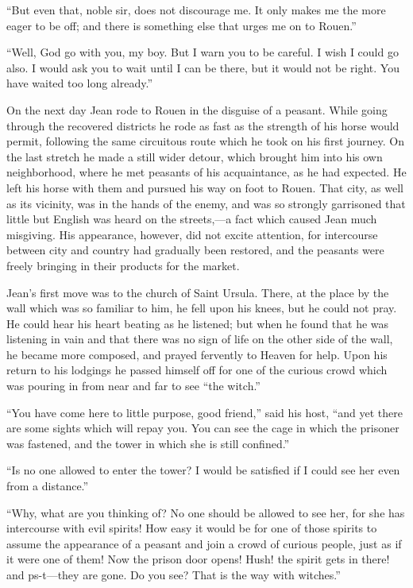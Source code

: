 ``But even that, noble sir, does not discourage me. It only makes me the
more eager to be off; and there is something else that urges me on to
Rouen.''

``Well, God go with you, my boy. But I warn you to be careful. I wish I
could go also. I would ask you to wait until I can be there, but it
would not be right. You have waited too long already.''

On the next day Jean rode to Rouen in the disguise of a peasant. While
going through the recovered districts he rode as fast as the strength of
his horse would permit, following the same circuitous route which he
took on his first journey. On the last stretch he made a still wider
detour, which brought him into his own neighborhood, where he met
peasants of his acquaintance, as he had expected. He left his horse with
them and pursued his way on foot to Rouen. That city, as well as its
vicinity, was in the hands of the enemy, and was so strongly garrisoned
that little but English was heard on the streets,---a fact which caused
Jean much misgiving. His appearance, however, did not excite attention,
for intercourse between city and country had gradually been restored,
and the peasants were freely bringing in their products for the market.

Jean's first move was to the church of Saint Ursula. There, at the place
by the wall which was so familiar to him, he fell upon his knees, but he
could not pray. He could hear his heart beating as he listened; but when
he found that he was listening in vain and that there was no sign of
life on the other side of the wall, he became more composed, and prayed
fervently to Heaven for help. Upon his return to his lodgings he passed
himself off for one of the curious crowd which was pouring in from near
and far to see ``the witch.''

``You have come here to little purpose, good friend,'' said his host,
``and yet there are some sights which will repay you. You can see the
cage in which the prisoner was fastened, and the tower in which she is
still confined.''

``Is no one allowed to enter the tower? I would be satisfied if I could
see her even from a distance.''

``Why, what are you thinking of? No one should be allowed to see her,
for she has intercourse with evil spirits! How easy it would be for one
of those spirits to assume the appearance of a peasant and join a crowd
of curious people, just as if it were one of them! Now the prison door
opens! Hush! the spirit gets in there! and ps-t---they are gone. Do you
see? That is the way with witches.''

